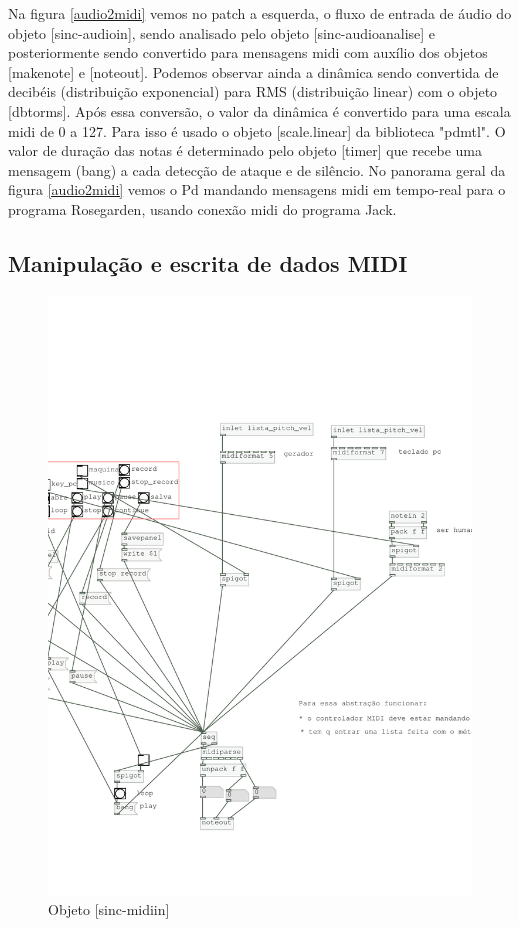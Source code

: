 \documentclass{ppgmus}
\begin{document}
Na figura \ref{audio2midi} vemos no patch a esquerda, o fluxo de entrada de áudio do objeto
[sinc-audioin], sendo analisado pelo objeto [sinc-audioanalise] e posteriormente
sendo convertido para mensagens midi com auxílio dos objetos [makenote] e [noteout].
Podemos observar ainda a dinâmica sendo convertida de decibéis (distribuição exponencial)
 para RMS (distribuição linear) com o objeto [dbtorms]. Após essa conversão,
o valor da dinâmica é convertido para uma escala midi de 0 a 127. Para isso é usado
o objeto [scale.linear] da biblioteca "pdmtl". O valor de duração das notas é determinado
pelo objeto [timer] que recebe uma mensagem (bang) a cada detecção de ataque e de silêncio.
No panorama geral da figura \ref{audio2midi} vemos o Pd mandando mensagens midi em tempo-real
para o programa Rosegarden, usando conexão midi do programa Jack. 



\subsection{Manipulação e escrita de dados MIDI}

% 

\begin{figure}
\includegraphics[scale=.5]{sinc-midiin}
\caption{Objeto [sinc-midiin]}
\label{sinc-midiin}
\end{figure}
\end{document}
